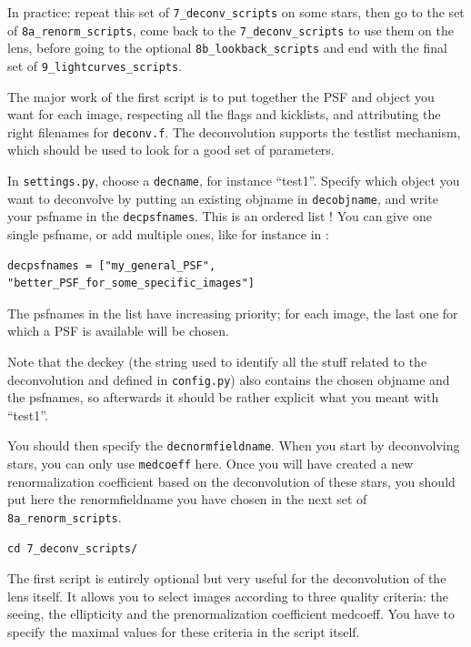 In practice: repeat this set of \verb+7_deconv_scripts+ on some stars, then go to the set of \verb+8a_renorm_scripts+, come back to the \verb+7_deconv_scripts+ to use them on the lens, before going to the optional \verb+8b_lookback_scripts+ and end with the final set of \verb+9_lightcurves_scripts+.

The major work of the first script is to put together the PSF and object you want for each image, respecting all the flags and kicklists, and attributing the right filenames for \verb+deconv.f+. The deconvolution supports the testlist mechanism, which should be used to look for a good set of parameters.

In \verb+settings.py+,  choose a \verb+decname+, for instance ``test1''. Specify which object you want to deconvolve by putting an existing objname in \verb+decobjname+, and write your psfname in the \verb+decpsfnames+. This is an ordered list ! You can give one single psfname, or add multiple ones, like for instance in :

\begin{Verbatim}[fontsize=\relsize{-1}]
decpsfnames = ["my_general_PSF", "better_PSF_for_some_specific_images"]
\end{Verbatim}

The psfnames in the list have increasing priority; for each image, the last one for which a PSF is available will be chosen.

Note that the deckey (the string used to identify all the stuff related to the deconvolution and defined in \verb+config.py+) also contains the chosen objname and the psfnames, so afterwards it should be rather explicit what you meant with ``test1''.

You should then specify the \verb+decnormfieldname+. When you start by deconvolving stars, you can only use \verb+medcoeff+ here. Once you will have created a new renormalization coefficient based on the deconvolution of these stars, you should put here the renormfieldname you have chosen in the next set of \verb+8a_renorm_scripts+.

\begin{Verbatim}
cd 7_deconv_scripts/
\end{Verbatim}

The first script is entirely optional but very useful for the deconvolution of the lens itself. It allows you to select images according to three quality criteria: the seeing, the ellipticity and the prenormalization coefficient medcoeff. You have to specify the maximal values for these criteria in the script itself.


